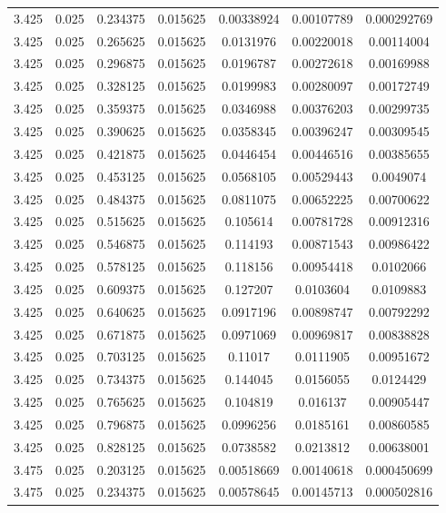 \begin{table}[bh]
\begin{center}
{\begin{tabular}{ccccccc}
3.425	 & 0.025 & 	0.234375	 & 0.015625	 & 0.00338924	 & 0.00107789	 & 0.000292769 \\ 
3.425	 & 0.025 & 	0.265625	 & 0.015625	 & 0.0131976	 & 0.00220018	 & 0.00114004 \\ 
3.425	 & 0.025 & 	0.296875	 & 0.015625	 & 0.0196787	 & 0.00272618	 & 0.00169988 \\ 
3.425	 & 0.025 & 	0.328125	 & 0.015625	 & 0.0199983	 & 0.00280097	 & 0.00172749 \\ 
3.425	 & 0.025 & 	0.359375	 & 0.015625	 & 0.0346988	 & 0.00376203	 & 0.00299735 \\ 
3.425	 & 0.025 & 	0.390625	 & 0.015625	 & 0.0358345	 & 0.00396247	 & 0.00309545 \\ 
3.425	 & 0.025 & 	0.421875	 & 0.015625	 & 0.0446454	 & 0.00446516	 & 0.00385655 \\ 
3.425	 & 0.025 & 	0.453125	 & 0.015625	 & 0.0568105	 & 0.00529443	 & 0.0049074 \\ 
3.425	 & 0.025 & 	0.484375	 & 0.015625	 & 0.0811075	 & 0.00652225	 & 0.00700622 \\ 
3.425	 & 0.025 & 	0.515625	 & 0.015625	 & 0.105614	 & 0.00781728	 & 0.00912316 \\ 
3.425	 & 0.025 & 	0.546875	 & 0.015625	 & 0.114193	 & 0.00871543	 & 0.00986422 \\ 
3.425	 & 0.025 & 	0.578125	 & 0.015625	 & 0.118156	 & 0.00954418	 & 0.0102066 \\ 
3.425	 & 0.025 & 	0.609375	 & 0.015625	 & 0.127207	 & 0.0103604	 & 0.0109883 \\ 
3.425	 & 0.025 & 	0.640625	 & 0.015625	 & 0.0917196	 & 0.00898747	 & 0.00792292 \\ 
3.425	 & 0.025 & 	0.671875	 & 0.015625	 & 0.0971069	 & 0.00969817	 & 0.00838828 \\ 
3.425	 & 0.025 & 	0.703125	 & 0.015625	 & 0.11017	 & 0.0111905	 & 0.00951672 \\ 
3.425	 & 0.025 & 	0.734375	 & 0.015625	 & 0.144045	 & 0.0156055	 & 0.0124429 \\ 
3.425	 & 0.025 & 	0.765625	 & 0.015625	 & 0.104819	 & 0.016137	 & 0.00905447 \\ 
3.425	 & 0.025 & 	0.796875	 & 0.015625	 & 0.0996256	 & 0.0185161	 & 0.00860585 \\ 
3.425	 & 0.025 & 	0.828125	 & 0.015625	 & 0.0738582	 & 0.0213812	 & 0.00638001 \\ 
3.475	 & 0.025 & 	0.203125	 & 0.015625	 & 0.00518669	 & 0.00140618	 & 0.000450699 \\ 
3.475	 & 0.025 & 	0.234375	 & 0.015625	 & 0.00578645	 & 0.00145713	 & 0.000502816 \\ 

\end{tabular}}
\end{center}
\end{table}
